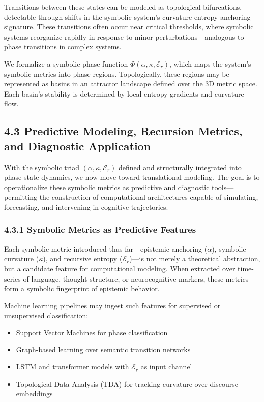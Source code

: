 Transitions between these states can be modeled as topological bifurcations, detectable through shifts in the symbolic system’s curvature-entropy-anchoring signature. These transitions often occur near critical thresholds, where symbolic systems reorganize rapidly in response to minor perturbations—analogous to phase transitions in complex systems.

We formalize a symbolic phase function $\Phi(\alpha, \kappa, \mathcal{E}_r)$, which maps the system’s symbolic metrics into phase regions. Topologically, these regions may be represented as basins in an attractor landscape defined over the 3D metric space. Each basin’s stability is determined by local entropy gradients and curvature flow.
\subsection*{4.3 Predictive Modeling, Recursion Metrics, and Diagnostic Application}

With the symbolic triad $(\alpha, \kappa, \mathcal{E}_r)$ defined and structurally integrated into phase-state dynamics, we now move toward translational modeling. The goal is to operationalize these symbolic metrics as predictive and diagnostic tools—permitting the construction of computational architectures capable of simulating, forecasting, and intervening in cognitive trajectories.

\subsubsection*{4.3.1 Symbolic Metrics as Predictive Features}

Each symbolic metric introduced thus far—epistemic anchoring ($\alpha$), symbolic curvature ($\kappa$), and recursive entropy ($\mathcal{E}_r$)—is not merely a theoretical abstraction, but a candidate feature for computational modeling. When extracted over time-series of language, thought structure, or neurocognitive markers, these metrics form a symbolic fingerprint of epistemic behavior.

Machine learning pipelines may ingest such features for supervised or unsupervised classification:
\begin{itemize}
\item Support Vector Machines for phase classification
\item Graph-based learning over semantic transition networks
\item LSTM and transformer models with $\mathcal{E}_r$ as input channel
\item Topological Data Analysis (TDA) for tracking curvature over discourse embeddings
\end{itemize}

